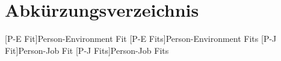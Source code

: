 \renewcommand{\chaptermark}[1]{\markboth{\spacedlowsmallcaps{#1}}{\spacedlowsmallcaps{#1}}}
\renewcommand{\sectionmark}[1]{\markright{\thesection\enspace\spacedlowsmallcaps{#1}}}
\chapter*{Abk\"{u}rzungsverzeichnis}

\begin{acronym}[UML]
  [P-E Fit]{Person-Environment Fit}
  [P-E Fits]{Person-Environment Fits}
  [P-J Fit]{Person-Job Fit}
  [P-J Fits]{Person-Job Fits}
\end{acronym}

\cleardoublepage
